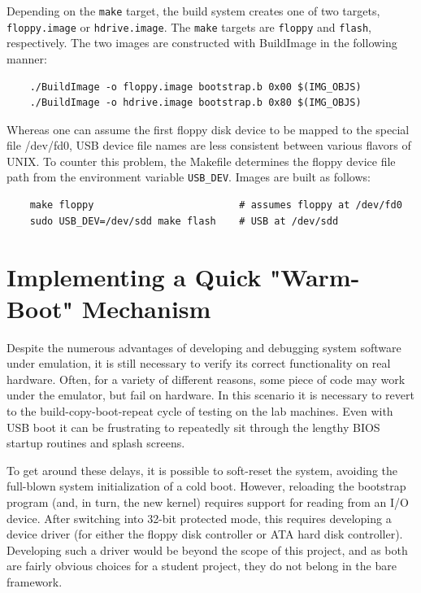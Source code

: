 \documentclass[titlepage]{article}
\begin{document}
Depending on the \verb!make! target, the build system creates one of two
targets, \verb!floppy.image! or \verb!hdrive.image!. The \verb!make! targets
are \verb!floppy! and \verb!flash!, respectively. The two images are constructed
with BuildImage in the following manner:

\begin{verbatim}
    ./BuildImage -o floppy.image bootstrap.b 0x00 $(IMG_OBJS)
    ./BuildImage -o hdrive.image bootstrap.b 0x80 $(IMG_OBJS)
\end{verbatim}

Whereas one can assume the first floppy disk device to be mapped to the special
file /dev/fd0, USB device file names are less consistent between various flavors
of UNIX. To counter this problem, the Makefile determines the floppy device file
path from the environment variable \verb!USB_DEV!. Images are built as follows:

\begin{verbatim}
    make floppy                         # assumes floppy at /dev/fd0
    sudo USB_DEV=/dev/sdd make flash    # USB at /dev/sdd
\end{verbatim}

\section{Implementing a Quick "Warm-Boot" Mechanism}

Despite the numerous advantages of developing and debugging system software
under emulation, it is still necessary to verify its correct functionality on
real hardware. Often, for a variety of different reasons, some piece of code may
work under the emulator, but fail on hardware. In this scenario it is necessary
to revert to the build-copy-boot-repeat cycle of testing on the lab machines.
Even with USB boot it can be frustrating to repeatedly sit through the lengthy
BIOS startup routines and splash screens.

To get around these delays, it is possible to soft-reset the system, avoiding
the full-blown system initialization of a cold boot. However, reloading the
bootstrap program (and, in turn, the new kernel) requires support for reading
from an I/O device. After switching into 32-bit protected mode, this requires
developing a device driver (for either the floppy disk controller or ATA hard
disk controller). Developing such a driver would be beyond the scope of this
project, and as both are fairly obvious choices for a student project, they do
not belong in the bare framework.
\end{document}
